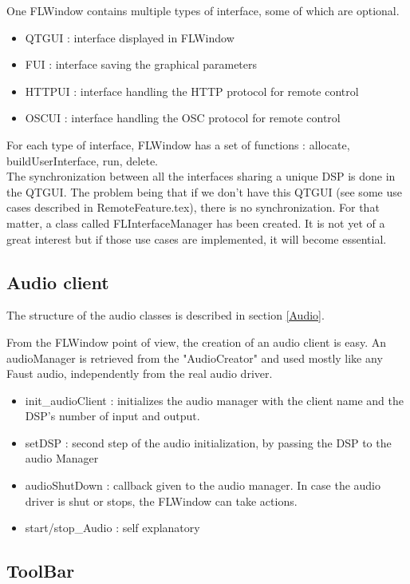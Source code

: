 \documentclass[a4paper]{article}
\begin{document}
One FLWindow contains multiple types of interface, some of which are optional. 

\begin{itemize}
\item QTGUI : interface displayed in FLWindow
\item FUI : interface saving the graphical parameters
\item HTTPUI : interface handling the HTTP protocol for remote control
\item OSCUI : interface handling the OSC protocol for remote control 
\end{itemize}

For each type of interface, FLWindow has a set of functions : allocate, buildUserInterface, run, delete. \\

The synchronization between all the interfaces sharing a unique DSP is done in the QTGUI. The problem being that if we don't have this QTGUI (see some use cases described in RemoteFeature.tex), there is no synchronization. For that matter, a class called FLInterfaceManager has been created. It is not yet of a great interest but if those use cases are implemented, it will become essential.

\subsection{Audio client}

The structure of the audio classes is described in section \ref{Audio}.

From the FLWindow point of view, the creation of an audio client is easy. An audioManager is retrieved from the "AudioCreator" and used mostly like any Faust audio, independently from the real audio driver. 

\begin{itemize}
\item init\_audioClient : initializes the audio manager with the client name and the DSP's number of input and output.
\item setDSP : second step of the audio initialization, by passing the DSP to the audio Manager
\item audioShutDown : callback given to the audio manager. In case the audio driver is shut or stops, the FLWindow can take actions. 
\item start/stop\_Audio : self explanatory

\end{itemize}
\subsection{ToolBar}
\end{document}
